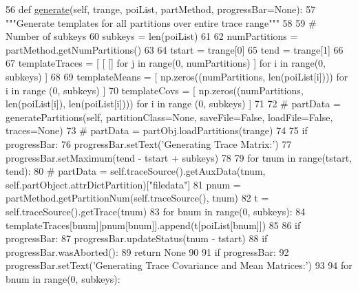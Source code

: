 \begin{DoxyCode}
56     \textcolor{keyword}{def }\hyperlink{classsoftware_1_1chipwhisperer_1_1analyzer_1_1attacks_1_1profiling__algorithms_1_1__base_1_1TemplateBasic_a4ee453aadecc53aafc26babccd45bfc9}{generate}(self, trange, poiList, partMethod, progressBar=None):
57         \textcolor{stringliteral}{"""Generate templates for all partitions over entire trace range"""}
58 
59         \textcolor{comment}{# Number of subkeys}
60         subkeys = len(poiList)
61 
62         numPartitions = partMethod.getNumPartitions()
63 
64         tstart = trange[0]
65         tend = trange[1]
66 
67         templateTraces = [ [ [] \textcolor{keywordflow}{for} j \textcolor{keywordflow}{in} range(0, numPartitions) ] \textcolor{keywordflow}{for} i \textcolor{keywordflow}{in} range(0, subkeys) ]
68 
69         templateMeans = [ np.zeros((numPartitions, len(poiList[i]))) \textcolor{keywordflow}{for} i \textcolor{keywordflow}{in} range (0, subkeys) ]
70         templateCovs = [ np.zeros((numPartitions, len(poiList[i]), len(poiList[i]))) \textcolor{keywordflow}{for} i \textcolor{keywordflow}{in} range (0, 
      subkeys) ]
71 
72         \textcolor{comment}{# partData = generatePartitions(self, partitionClass=None, saveFile=False, loadFile=False,
       traces=None)}
73         \textcolor{comment}{# partData = partObj.loadPartitions(trange)}
74 
75         \textcolor{keywordflow}{if} progressBar:
76             progressBar.setText(\textcolor{stringliteral}{'Generating Trace Matrix:'})
77             progressBar.setMaximum(tend - tstart + subkeys)
78 
79         \textcolor{keywordflow}{for} tnum \textcolor{keywordflow}{in} range(tstart, tend):
80             \textcolor{comment}{# partData = self.traceSource().getAuxData(tnum, self.partObject.attrDictPartition)["filedata"]}
81             pnum = partMethod.getPartitionNum(self.traceSource(), tnum)
82             t = self.traceSource().getTrace(tnum)
83             \textcolor{keywordflow}{for} bnum \textcolor{keywordflow}{in} range(0, subkeys):
84                 templateTraces[bnum][pnum[bnum]].append(t[poiList[bnum]])
85 
86             \textcolor{keywordflow}{if} progressBar:
87                 progressBar.updateStatus(tnum - tstart)
88                 \textcolor{keywordflow}{if} progressBar.wasAborted():
89                     \textcolor{keywordflow}{return} \textcolor{keywordtype}{None}
90 
91         \textcolor{keywordflow}{if} progressBar:
92             progressBar.setText(\textcolor{stringliteral}{'Generating Trace Covariance and Mean Matrices:'})
93 
94         \textcolor{keywordflow}{for} bnum \textcolor{keywordflow}{in} range(0, subkeys):

\end{DoxyCode}

